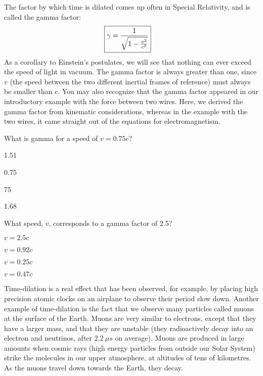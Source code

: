 The factor by which time is dilated comes up often in Special Relativity, and is called the gamma factor:
\begin{align*}
\Aboxed{\gamma = \frac{1}{\sqrt{1-\frac{v^2}{c^2}}}}
\end{align*}
As a corollary to Einstein's postulates, we will see that nothing can ever exceed the speed of light in vacuum. The gamma factor is always greater than one, since $v$ (the speed between the two different inertial frames of reference) must always be smaller than $c$. You may also recognize that the gamma factor appeared in our introductory example with the force between two wires. Here, we derived the gamma factor from kinematic considerations, whereas in the example with the two wires, it came straight out of the equations for electromagnetism.

\begin{checkpoint}{}
	\begin{MCquestion}{What is gamma for a speed of $v=0.75c$?}
		\item 1.51 \correct
		\item 0.75
		\item 75
		\item 1.68
	\end{MCquestion}
\end{checkpoint}
\begin{checkpoint}{}

	\begin{MCquestion}{What speed, $v$, corresponds to a gamma factor of \SI{2.5}{}?}
		\item $v=2.5c$
		\item $v=0.92c$ \correct
		\item $v=0.25c$
		\item $v=0.47c$
	\end{MCquestion}
\end{checkpoint}

Time-dilation is a real effect that has been observed, for example, by placing high precision atomic clocks on an airplane to observe their period slow down. Another example of time-dilation is the fact that we observe many particles called muons at the surface of the Earth. Muons are very similar to electrons, except that they have a larger mass, and that they are unstable (they radioactively decay into an electron and neutrinos, after $\SI{2.2}{\mu s}$ on average). Muons are produced in large amounts when cosmic rays (high energy particles from outside our Solar System) strike the molecules in our upper atmosphere, at altitudes of tens of kilometres. As the muons travel down towards the Earth, they decay.

